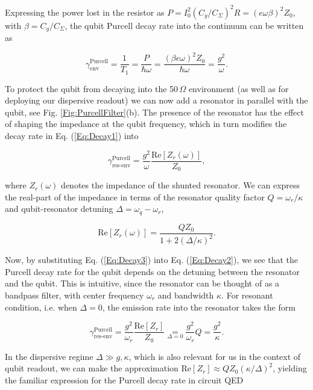 \documentclass[aip,apr,twocolumn,showpacs,superscriptaddress,groupedaddress,nofootinbib,reprint]{revtex4-1}  %
\begin{document}
Expressing the power lost in the resistor as $P = I_{0}^2(C_g/C_{\Sigma})^2R = (e \omega \beta)^2Z_0$, with $\beta = C_g/C_{\Sigma}$, the qubit Purcell decay rate into the continuum can be written as

\begin{equation}
\gamma^{\text{Purcell}}_{\text{env}} = \frac{1}{T_1} = \frac{P}{\hbar \omega} = \frac{(\beta e \omega)^2 Z_0}{\hbar \omega} = \frac{g^2}{\omega}.
\label{Eq:Decay1}
\end{equation}

To protect the qubit from decaying into the 50$\,\Omega$ environment (as well as for deploying our dispersive readout) we can now add a resonator in parallel with the qubit, see Fig. \ref{Fig:PurcellFilter}(b). The presence of the resonator has the effect of shaping the impedance at the qubit frequency, which in turn modifies the decay rate in Eq. (\ref{Eq:Decay1}) into

\begin{equation}
\gamma^{\text{Purcell}}_{\text{res-env}} = \frac{g^2}{\omega}\frac{\mbox{Re}[Z_r(\omega)]}{Z_0},
\label{Eq:Decay2}
\end{equation}

\noindent where $Z_r(\omega)$ denotes the impedance of the shunted resonator. We can express the real-part of the impedance in terms of the resonator quality factor $Q = \omega_r/\kappa$ and qubit-resonator detuning $\Delta = \omega_{q} - \omega_{r}$,

\begin{equation}
\mbox{Re}[Z_r(\omega)] = \frac{QZ_0}{1 + 2(\Delta/\kappa)^2}.
\label{Eq:Decay3}
\end{equation}

Now, by substituting Eq. (\ref{Eq:Decay3}) into Eq. (\ref{Eq:Decay2}), we see that the Purcell decay rate for the qubit depends on the detuning between the resonator and the qubit. This is intuitive, since the resonator can be thought of as a bandpass filter, with center frequency $\omega_r$ and bandwidth $\kappa$. For resonant condition, i.e. when $\Delta = 0$, the emission rate into the resonator takes the form

\begin{equation}
\gamma^{\text{Purcell}}_{\text{res-env}} = \frac{g^2}{\omega_{r}}\frac{\mbox{Re}[Z_r]}{Z_0} \underset{\Delta=0}{=} \frac{g^2}{\omega_{r}}Q = \frac{g^2}{\kappa}.
\label{Eq:Decay4}
\end{equation}

In the dispersive regime $\Delta \gg g,\kappa$, which is also relevant for us in the context of qubit readout, we can make the approximation $\mbox{Re}[Z_r] \approx QZ_0 (\kappa/\Delta)^2$, yielding the familiar expression for the Purcell decay rate in circuit QED\cite{Houck2008}
\end{document}
